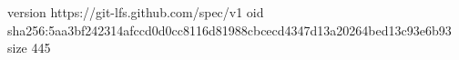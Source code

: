 version https://git-lfs.github.com/spec/v1
oid sha256:5aa3bf242314afccd0d0cc8116d81988cbcecd4347d13a20264bed13c93e6b93
size 445
